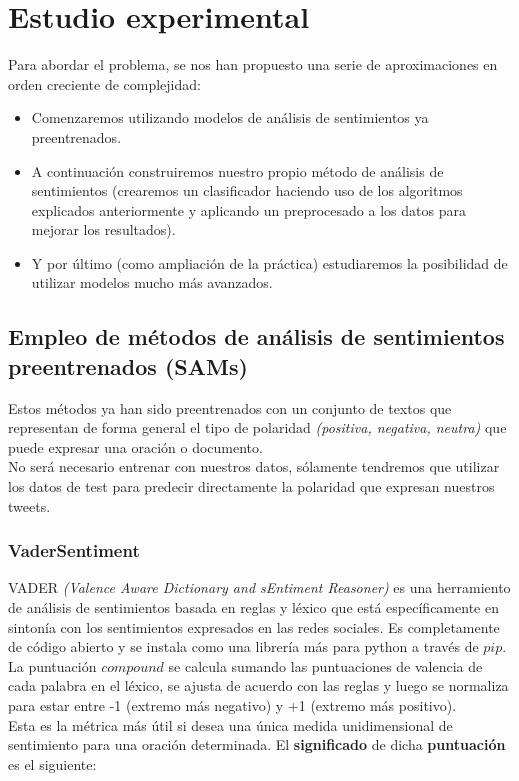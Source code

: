 \documentclass[a4paper,12pt]{report}
\begin{document}
\chapter{Estudio experimental}

Para abordar el problema, se nos han propuesto una serie de aproximaciones en orden creciente de complejidad:

\begin{itemize}

\item Comenzaremos utilizando modelos de análisis de sentimientos ya preentrenados.
\item A continuación construiremos nuestro propio método de análisis de sentimientos (crearemos un clasificador haciendo uso de los algoritmos explicados anteriormente y aplicando un preprocesado a los datos para mejorar los resultados).
\item Y por último (como ampliación de la práctica) estudiaremos la posibilidad de utilizar modelos mucho más avanzados.
\end{itemize}


\section{Empleo de métodos de análisis de sentimientos preentrenados (SAMs)}

{\setlength{\parindent}{0cm}
Estos métodos ya han sido preentrenados con un conjunto de textos que representan de forma general el tipo de polaridad \textit{(positiva, negativa, neutra)} que puede expresar una oración o documento. }
\vspace{2mm}\\
No será necesario entrenar con nuestros datos, sólamente tendremos que utilizar los datos de test para predecir directamente la polaridad que expresan nuestros tweets.

\subsection{VaderSentiment}

{\setlength{\parindent}{0cm}
VADER \textit{(Valence Aware Dictionary and sEntiment Reasoner)} es una herramiento de análisis de sentimientos basada en reglas y léxico que está específicamente en sintonía con los sentimientos expresados en las redes sociales. Es completamente de código abierto y se instala como una librería más para python a través de $pip$.}
\vspace{2mm}\\
La puntuación $compound$ se calcula sumando las puntuaciones de valencia de cada palabra en el léxico, se ajusta de acuerdo con las reglas y luego se normaliza para estar entre -1 (extremo más negativo) y +1 (extremo más positivo).
\vspace{2mm}\\
Esta es la métrica más útil si desea una única medida unidimensional de sentimiento para una oración determinada.
\clearpage
El \textbf{significado} de dicha \textbf{puntuación} es el siguiente:
\end{document}
